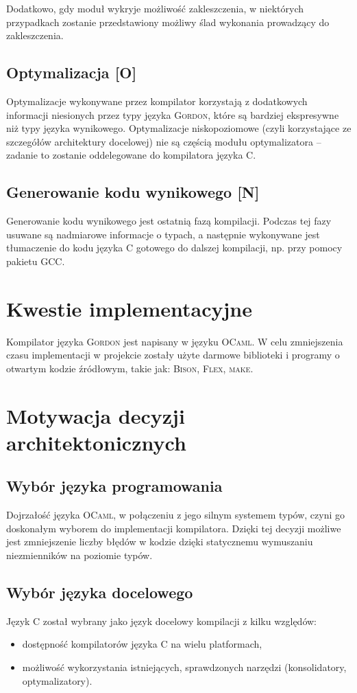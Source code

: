 \documentclass{documentation}
\begin{document}
Dodatkowo, gdy moduł wykryje możliwość zakleszczenia, w niektórych przypadkach zostanie przedstawiony możliwy ślad wykonania prowadzący do zakleszczenia. 

\subsection{Optymalizacja [O]}
\noindent Optymalizacje wykonywane przez kompilator korzystają z dodatkowych informacji
niesionych przez typy języka \textsc{Gordon}, które są bardziej ekspresywne niż typy języka
wynikowego.
Optymalizacje niskopoziomowe (czyli korzystające ze szczegółów architektury docelowej) nie
są częścią modułu optymalizatora -- zadanie to zostanie oddelegowane do kompilatora języka \textsc{C}.

\subsection{Generowanie kodu wynikowego [N]}
\noindent Generowanie kodu wynikowego jest ostatnią fazą kompilacji. Podczas tej fazy usuwane są
nadmiarowe informacje o typach, a następnie wykonywane jest tłumaczenie do kodu języka
\textsc{C} gotowego do dalszej kompilacji, np. przy pomocy pakietu \textsc{GCC}.

\section{Kwestie implementacyjne}
\noindent Kompilator języka \textsc{Gordon} jest napisany w języku \textsc{OCaml}. W celu
zmniejszenia czasu implementacji w projekcie zostały użyte darmowe biblioteki i programy o otwartym
kodzie źródłowym, takie jak: \textsc{Bison}, \textsc{Flex}, \textsc{make}.

\section{Motywacja decyzji architektonicznych}
\subsection{Wybór języka programowania}
\noindent Dojrzałość języka \textsc{OCaml}, w połączeniu z jego silnym systemem typów,
czyni go doskonałym wyborem do implementacji kompilatora. Dzięki tej
decyzji możliwe jest zmniejszenie liczby błędów w kodzie dzięki statycznemu
wymuszaniu niezmienników na poziomie typów.

\subsection{Wybór języka docelowego}
\noindent Język \textsc{C} został wybrany jako język docelowy kompilacji z kilku względów:
\begin{itemize}
    \item dostępność kompilatorów języka \textsc{C} na wielu platformach,
    \item możliwość wykorzystania istniejących, sprawdzonych narzędzi (konsolidatory,
        optymalizatory).
\end{itemize}
\end{document}
